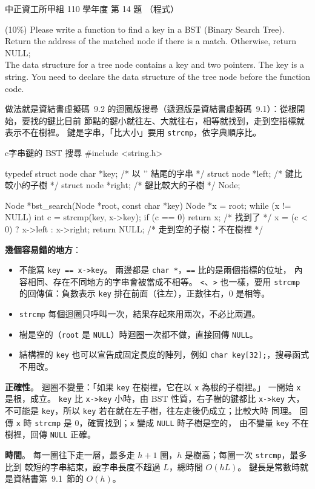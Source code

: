 \begin{pastexam}[label={px:ccu-110-swa-11}]{中正資工所甲組 110 學年度 第 14 題}
（程式）

(10\%) Please write a function to find a key in a BST (Binary Search Tree). Return the address of
the matched node if there is a match. Otherwise, return NULL;\\
The data structure for a tree node contains a key and two pointers. The key is a string. You need
to declare the data structure of the tree node before the function code.
\end{pastexam}

\begin{pastsoln}
做法就是資結書虛擬碼~9.2 的迴圈版搜尋（遞迴版是資結書虛擬碼~9.1）：從根開始，要找的鍵比目前
節點的鍵小就往左、大就往右，相等就找到，走到空指標就表示不在樹裡。 鍵是字串，「比大小」要用
\texttt{strcmp}，依字典順序比。

\begin{code}{c}{字串鍵的 BST 搜尋}
#include <string.h>

typedef struct node {
    char *key;            /* 以 '\0' 結尾的字串 */
    struct node *left;    /* 鍵比較小的子樹 */
    struct node *right;   /* 鍵比較大的子樹 */
} Node;

Node *bst_search(Node *root, const char *key)
{
    Node *x = root;
    while (x != NULL) {
        int c = strcmp(key, x->key);
        if (c == 0)
            return x;              /* 找到了 */
        x = (c < 0) ? x->left : x->right;
    }
    return NULL;                   /* 走到空的子樹：不在樹裡 */
}
\end{code}

\textbf{幾個容易錯的地方}：
\begin{itemize}
\item 不能寫 \texttt{key == x->key}。 兩邊都是 \texttt{char *}，\texttt{==} 比的是兩個指標的位址，
內容相同、存在不同地方的字串會被當成不相等。 \texttt{<}、\texttt{>} 也一樣，要用 \texttt{strcmp}
的回傳值：負數表示 \texttt{key} 排在前面（往左），正數往右，$0$ 是相等。
\item \texttt{strcmp} 每個迴圈只呼叫一次，結果存起來用兩次，不必比兩遍。
\item 樹是空的（\texttt{root} 是 \texttt{NULL}）時迴圈一次都不做，直接回傳 \texttt{NULL}。
\item 結構裡的 \texttt{key} 也可以宣告成固定長度的陣列，例如 \texttt{char key[32];}，搜尋函式不用改。
\end{itemize}

\textbf{正確性}。 迴圈不變量：「如果 \texttt{key} 在樹裡，它在以 \texttt{x} 為根的子樹裡。」 一開始
\texttt{x} 是根，成立。 \texttt{key} 比 \texttt{x->key} 小時，由 BST 性質，右子樹的鍵都比
\texttt{x->key} 大，不可能是 \texttt{key}，所以 \texttt{key} 若在就在左子樹，往左走後仍成立；比較大時
同理。 回傳 \texttt{x} 時 \texttt{strcmp} 是 $0$，確實找到；\texttt{x} 變成 \texttt{NULL} 時子樹是空的，
由不變量 \texttt{key} 不在樹裡，回傳 \texttt{NULL} 正確。

\textbf{時間}。 每一圈往下走一層，最多走 $h + 1$ 圈，$h$ 是樹高；每圈一次 \texttt{strcmp}，最多比到
較短的字串結束，設字串長度不超過 $L$，總時間 $O(hL)$。 鍵長是常數時就是資結書第~9.1~節的 $O(h)$。
\end{pastsoln}
